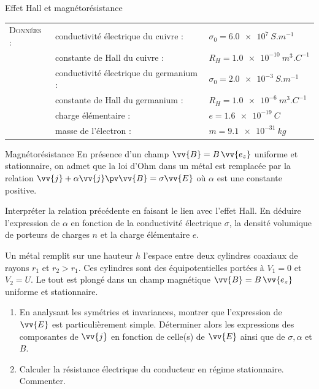 \begin{exo}[PC][2][TD]{Effet Hall et magnétorésistance}
\begin{tabular}{lll}
  \textsc{Données} :  & conductivité électrique du cuivre : & $\sigma_0 = \SI{6.0e7}{S.m^{-1}}$ \\
  &constante de Hall du cuivre : & $R_H = \SI{1.0e-10}{m^3.C^{-1}}$ \\
  &conductivité électrique du germanium : & $\sigma_0 = \SI{2.0e-3}{S.m^{-1}}$ \\
  &constante de Hall du germanium : & $R_H = \SI{1.0e-6}{m^3.C^{-1}}$ \\
  &charge élémentaire : & $e = \SI{1.6e-19}{C}$ \\
  &masse de l'électron : & $m = \SI{9.1e-31}{kg}$ \\
\end{tabular}
\end{exo}

\begin{exo}[PC][1][colle]{Magnétorésistance}
En présence d'un champ $\vv{B}=B\,\vv{e_z}$ uniforme et stationnaire, on admet que la loi d'Ohm dans un métal est remplacée par la relation $\vv{j}+\alpha\vv{j}\pv\vv{B}=\sigma\vv{E}$ où $\alpha$ est une constante positive.
\begin{quest}
\item Interpréter la relation précédente en faisant le lien avec l'effet Hall. En déduire l'expression de $\alpha$ en fonction de la conductivité électrique $\sigma$, la densité volumique de porteurs de charges $n$ et la charge élémentaire $e$.
\item Un métal remplit sur une hauteur $h$ l'espace entre deux cylindres coaxiaux de rayons $r_1$ et $r_2>r_1$. Ces cylindres sont des équipotentielles portées à $V_1=0$ et $V_2=U$. Le tout est plongé dans un champ magnétique $\vv{B}=B\,\vv{e_z}$ uniforme et stationnaire.
\begin{enumerate}
\item En analysant les symétries et invariances, montrer que l'expression de $\vv{E}$ est particulièrement simple. Déterminer alors les expressions des composantes de $\vv{j}$ en fonction de celle(s) de $\vv{E}$ ainsi que de $\sigma,\alpha$ et $B$.
\item Calculer la résistance électrique du conducteur en régime stationnaire. Commenter.
\end{enumerate}
\end{quest}
\end{exo}


